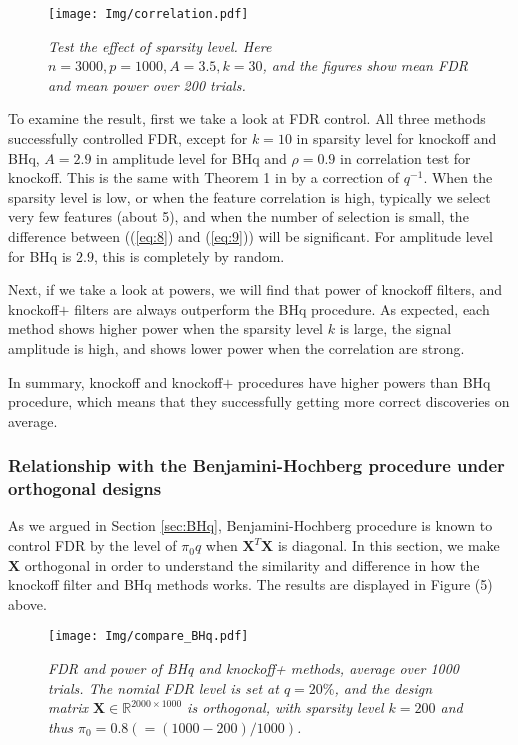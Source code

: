 \documentclass{uwstat572}
\begin{document}
\begin{figure}\label{Fig:4}
	\centering\texttt{[image: Img/correlation.pdf]}
	\caption{{\it Test the effect of sparsity level. Here $n=3000, p=1000, A=3.5, k=30$, and the figures show mean FDR and mean power over 200 trials.}}
\end{figure}  

To examine the result, first we take a look at FDR control. All three methods successfully controlled FDR, except for $k=10$ in sparsity level for knockoff and BHq, $A=2.9$ in amplitude level for BHq and $\rho = 0.9$ in correlation test for knockoff. This is the same with {\sc Theorem 1} in by a correction of $q^{-1}$. When the sparsity level is low, or when the feature correlation is high, typically we select very few features (about 5), and when the number of selection is small, the difference between ((\ref{eq:8}) and (\ref{eq:9})) will be significant. For amplitude level for BHq is $2.9$, this is completely by random.

Next, if we take a look at powers, we will find that power of knockoff filters, and knockoff$+$ filters are always outperform the BHq procedure. As expected, each method shows higher power when the sparsity level $k$ is large, the signal amplitude is high, and shows lower power when the correlation are strong. 

In summary, knockoff and knockoff$+$ procedures have higher powers than BHq procedure, which means that they successfully getting more correct discoveries on average.

\subsubsection{Relationship with the Benjamini-Hochberg procedure under orthogonal designs}
As we argued in Section \ref{sec:BHq}, Benjamini-Hochberg procedure is known to control FDR by the level of $\pi_0q$ when $\bm{X}^T\bm{X}$ is diagonal. In this section, we make $\bm{X}$ orthogonal in order to understand the similarity and difference in how the knockoff filter and BHq methods works. The results are displayed in Figure (5) above.

\begin{figure}\label{Fig:5}
	\centering\texttt{[image: Img/compare\_BHq.pdf]}
	\caption{{\it FDR and power of BHq and knockoff+ methods, average over 1000 trials. The nomial FDR level is set at $q=20\%$, and the design matrix $\bm{X}\in\mathbb{R}^{2000\times1000}$ is orthogonal, with sparsity level $k=200$ and thus $\pi_0=0.8(= (1000-200)/1000)$.}}
\end{figure} 
 
\end{document}
